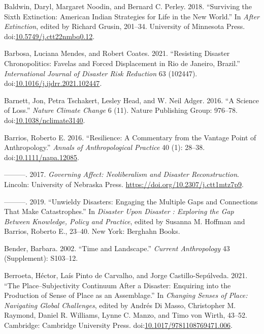 \documentclass[
]{article}
\newlength{\cslhangindent}
\newenvironment{CSLReferences}[2] %
 {\begin{list}{}{%
  \setlength{\itemindent}{0pt}
  \setlength{\leftmargin}{0pt}
  \setlength{\parsep}{0pt}
  \ifodd #1
   \setlength{\leftmargin}{\cslhangindent}
   \setlength{\itemindent}{-1\cslhangindent}
  \fi
  \setlength{\itemsep}{#2\baselineskip}}}
 {\end{list}}
\begin{document}
\begin{CSLReferences}{1}{0}
Baldwin, Daryl, Margaret Noodin, and Bernard C. Perley. 2018. {``Surviving the {Sixth Extinction}: {American Indian Strategies} for {Life} in the {New World}.''} In \emph{After {Extinction}}, edited by Richard Grusin, 201--34. University of Minnesota Press. doi:\href{https://doi.org/10.5749/j.ctt22nmbq0.12}{10.5749/j.ctt22nmbq0.12}.

Barbosa, Luciana Mendes, and Robert Coates. 2021. {``Resisting Disaster Chronopolitics: {Favelas} and Forced Displacement in {Rio} de {Janeiro}, {Brazil}.''} \emph{International Journal of Disaster Risk Reduction} 63 (102447). doi:\href{https://doi.org/10.1016/j.ijdrr.2021.102447}{10.1016/j.ijdrr.2021.102447}.

Barnett, Jon, Petra Tschakert, Lesley Head, and W. Neil Adger. 2016. {``A Science of Loss.''} \emph{Nature Climate Change} 6 (11). Nature Publishing Group: 976--78. doi:\href{https://doi.org/10.1038/nclimate3140}{10.1038/nclimate3140}.

Barrios, Roberto E. 2016. {``Resilience: {A} Commentary from the Vantage Point of Anthropology.''} \emph{Annals of Anthropological Practice} 40 (1): 28--38. doi:\href{https://doi.org/10.1111/napa.12085}{10.1111/napa.12085}.

---------. 2017. \emph{Governing {Affect}: {Neoliberalism} and {Disaster Reconstruction}}. Lincoln: University of Nebraska Press. \url{https://doi.org/10.2307/j.ctt1mtz7p9}.

---------. 2019. {``Unwieldy {Disasters}: {Engaging} the {Multiple Gaps} and {Connections That Make Catastrophes}.''} In \emph{Disaster Upon {Disaster} : {Exploring} the {Gap Between Knowledge}, {Policy} and {Practice}}, edited by Susanna M. Hoffman and Barrios, Roberto E., 23--40. New York: Berghahn Books.

Bender, Barbara. 2002. {``Time and {Landscape}.''} \emph{Current Anthropology} 43 (Supplement): S103--12.

Berroeta, Héctor, Laís Pinto de Carvalho, and Jorge Castillo-Sepúlveda. 2021. {``The {Place}--{Subjectivity Continuum} After a {Disaster}: {Enquiring} into the {Production} of {Sense} of {Place} as an {Assemblage}.''} In \emph{Changing {Senses} of {Place}: {Navigating Global Challenges}}, edited by Andrés Di Masso, Christopher M. Raymond, Daniel R. Williams, Lynne C. Manzo, and Timo von Wirth, 43--52. Cambridge: Cambridge University Press. doi:\href{https://doi.org/10.1017/9781108769471.006}{10.1017/9781108769471.006}.


\end{CSLReferences}
\end{document}
